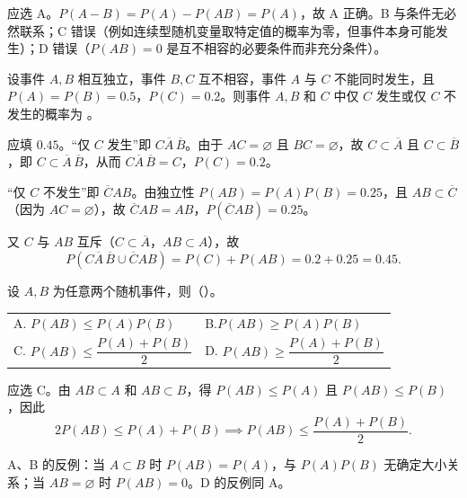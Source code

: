 \documentclass[lang=cn,11pt]{elegantbook}
\begin{document}
\begin{solution}
应选 A。\(P(A-B)=P(A)-P(AB)=P(A)\)，故 A 正确。B 与条件无必然联系；C 错误（例如连续型随机变量取特定值的概率为零，但事件本身可能发生）；D 错误（\(P(AB)=0\) 是互不相容的必要条件而非充分条件）。
\end{solution}


\begin{exercise}[提高]\label{exer:1-49}
设事件 \(A,B\) 相互独立，事件 \(B,C\) 互不相容，事件 \(A\) 与 \(C\) 不能同时发生，且 \(P(A)=P(B)=0.5\)，\(P(C)=0.2\)。则事件 \(A,B\) 和 \(C\) 中仅 \(C\) 发生或仅 \(C\) 不发生的概率为 \underline{\hspace{2cm}}。
\end{exercise}

\begin{solution}
应填 \(0.45\)。“仅 \(C\) 发生”即 \(C\overline{A}\,\overline{B}\)。由于 \(AC=\varnothing\) 且 \(BC=\varnothing\)，故 \(C\subset\overline{A}\) 且 \(C\subset\overline{B}\)，即 \(C\subset\overline{A}\,\overline{B}\)，从而 \(C\overline{A}\,\overline{B}=C\)，\(P(C)=0.2\)。

“仅 \(C\) 不发生”即 \(\overline{C}AB\)。由独立性 \(P(AB)=P(A)P(B)=0.25\)，且 \(AB\subset\overline{C}\)（因为 \(AC=\varnothing\)），故 \(\overline{C}AB=AB\)，\(P(\overline{C}AB)=0.25\)。

又 \(C\) 与 \(AB\) 互斥（\(C\subset\overline{A}\)，\(AB\subset A\)），故
\[
P(C\overline{A}\,\overline{B}\cup\overline{C}AB) = P(C)+P(AB) = 0.2+0.25 = 0.45.
\]
\end{solution}

\begin{exercise}[提高]\label{exer:1-50}
设 \(A,B\) 为任意两个随机事件，则（\quad）。\par
\begin{tabular}{ll}
A. \(P(AB)\le P(A)P(B)\) & B.\(P(AB)\ge P(A)P(B)\) \\[4pt]
C. \(P(AB)\le \dfrac{P(A)+P(B)}{2}\) & D. \(P(AB)\ge \dfrac{P(A)+P(B)}{2}\)
\end{tabular}
\end{exercise}

\begin{solution}
应选 C。由 \(AB\subset A\) 和 \(AB\subset B\)，得 \(P(AB)\le P(A)\) 且 \(P(AB)\le P(B)\)，因此
\[
2P(AB)\le P(A)+P(B) \implies P(AB)\le\frac{P(A)+P(B)}{2}.
\]

A、B 的反例：当 \(A\subset B\) 时 \(P(AB)=P(A)\)，与 \(P(A)P(B)\) 无确定大小关系；当 \(AB=\varnothing\) 时 \(P(AB)=0\)。D 的反例同 A。
\end{solution}
\end{document}
